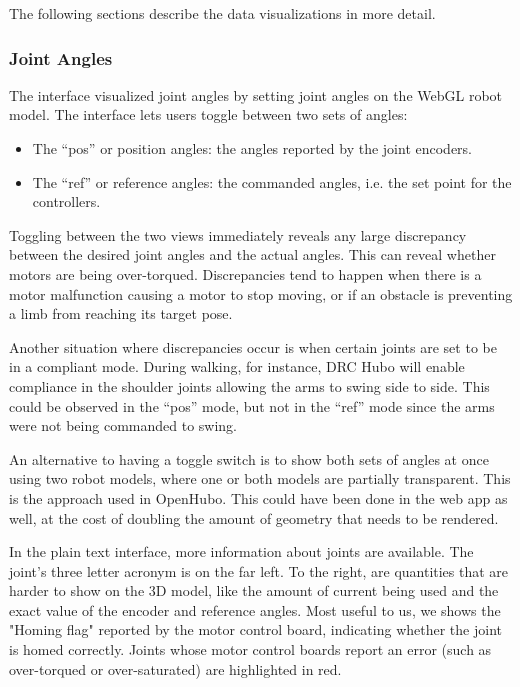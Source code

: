 \documentclass[letterpaper, 10 pt, conference]{ieee/ieeeconf}  %
\begin{document}
The following sections describe the data visualizations in more detail.

\subsubsection{Joint Angles}
The interface visualized joint angles by setting joint angles on the WebGL robot model.
The interface lets users toggle between two sets of angles:
\begin{itemize}
\item The ``pos'' or position angles: the angles reported by the joint encoders.
\item The ``ref'' or reference angles: the commanded angles, i.e. the set point for the controllers. 
\end{itemize}
Toggling between the two views immediately reveals any large discrepancy between the desired joint angles and the actual angles.
This can reveal whether motors are being over-torqued.
Discrepancies tend to happen when there is a motor malfunction causing a motor to stop moving, or if an obstacle is preventing a limb from reaching its target pose.

Another situation where discrepancies occur is when certain joints are set to be in a compliant mode.
During walking, for instance, DRC Hubo will enable compliance in the shoulder joints allowing the arms to swing side to side.
This could be observed in the ``pos'' mode, but not in the ``ref'' mode since the arms were not being commanded to swing.

An alternative to having a toggle switch is to show both sets of angles at once using two robot models, where one or both models are partially transparent.
This is the approach used in OpenHubo.
This could have been done in the web app as well, at the cost of doubling the amount of geometry that needs to be rendered.

In the plain text interface, more information about joints are available.
The joint's three letter acronym is on the far left.
To the right, are quantities that are harder to show on the 3D model, like the amount of current being used and the exact value of the encoder and reference angles.
Most useful to us, we shows the "Homing flag" reported by the motor control board, indicating whether the joint is homed correctly.
Joints whose motor control boards report an error (such as over-torqued or over-saturated) are highlighted in red.
\end{document}
